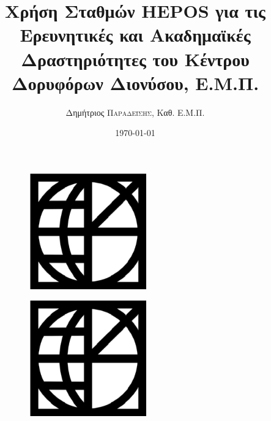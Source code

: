 \documentclass[11pt]{article}
\title{Χρήση Σταθμών HEPOS για τις Ερευνητικές και Ακαδημαϊκές Δραστηριότητες του Κέντρου Δορυφόρων Διονύσου, Ε.Μ.Π.} %
\author{Δημήτριος \textsc{Παραδείσης}, Καθ. Ε.Μ.Π.}
\date{\today} %
\begin{document}
\makeatletter
\begin{titlepage}
    \begin{center}
        \vspace*{1cm}
        
        \noindent\makebox[\linewidth]{\rule{\paperwidth}{1.5pt}}
        
        \begin{figure}[h]
          \begin{subfigure}{0.2\textwidth}\includegraphics[width=0.9\linewidth, height=5cm,left]{../figures/DSOtrans.png}\end{subfigure}
          \begin{subfigure}{0.2\textwidth}\includegraphics[width=0.9\linewidth, height=5cm,left]{../figures/DSOtrans.png}\end{subfigure}
        \end{figure}
        
        \noindent\makebox[\linewidth]{\rule{\paperwidth}{1.5pt}}
        
        \vspace{1.5cm}
        
        \textbf{\@title}
        
        \vspace{1.5cm}
        
        \textsc{\@author}
        
        \vspace{1.0cm}
        

\end{center}
\end{titlepage}
\end{document}
